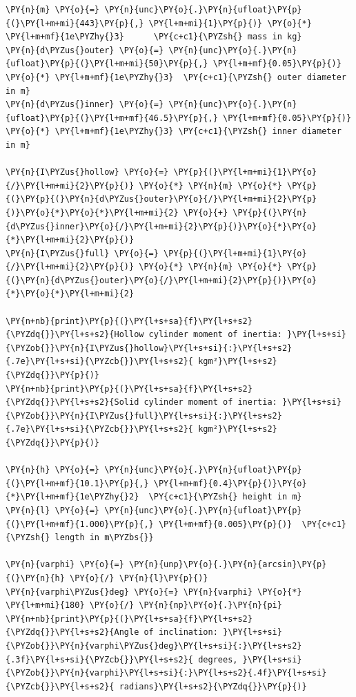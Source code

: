     \begin{tcolorbox}[breakable, size=fbox, boxrule=1pt, pad at break*=1mm,colback=cellbackground, colframe=cellborder]
\begin{Verbatim}[commandchars=\\\{\}]
\PY{n}{m} \PY{o}{=} \PY{n}{unc}\PY{o}{.}\PY{n}{ufloat}\PY{p}{(}\PY{l+m+mi}{443}\PY{p}{,} \PY{l+m+mi}{1}\PY{p}{)} \PY{o}{*} \PY{l+m+mf}{1e\PYZhy{}3}      \PY{c+c1}{\PYZsh{} mass in kg}
\PY{n}{d\PYZus{}outer} \PY{o}{=} \PY{n}{unc}\PY{o}{.}\PY{n}{ufloat}\PY{p}{(}\PY{l+m+mi}{50}\PY{p}{,} \PY{l+m+mf}{0.05}\PY{p}{)} \PY{o}{*} \PY{l+m+mf}{1e\PYZhy{}3}  \PY{c+c1}{\PYZsh{} outer diameter in m}
\PY{n}{d\PYZus{}inner} \PY{o}{=} \PY{n}{unc}\PY{o}{.}\PY{n}{ufloat}\PY{p}{(}\PY{l+m+mf}{46.5}\PY{p}{,} \PY{l+m+mf}{0.05}\PY{p}{)} \PY{o}{*} \PY{l+m+mf}{1e\PYZhy{}3} \PY{c+c1}{\PYZsh{} inner diameter in m}

\PY{n}{I\PYZus{}hollow} \PY{o}{=} \PY{p}{(}\PY{l+m+mi}{1}\PY{o}{/}\PY{l+m+mi}{2}\PY{p}{)} \PY{o}{*} \PY{n}{m} \PY{o}{*} \PY{p}{(}\PY{p}{(}\PY{n}{d\PYZus{}outer}\PY{o}{/}\PY{l+m+mi}{2}\PY{p}{)}\PY{o}{*}\PY{o}{*}\PY{l+m+mi}{2} \PY{o}{+} \PY{p}{(}\PY{n}{d\PYZus{}inner}\PY{o}{/}\PY{l+m+mi}{2}\PY{p}{)}\PY{o}{*}\PY{o}{*}\PY{l+m+mi}{2}\PY{p}{)}
\PY{n}{I\PYZus{}full} \PY{o}{=} \PY{p}{(}\PY{l+m+mi}{1}\PY{o}{/}\PY{l+m+mi}{2}\PY{p}{)} \PY{o}{*} \PY{n}{m} \PY{o}{*} \PY{p}{(}\PY{n}{d\PYZus{}outer}\PY{o}{/}\PY{l+m+mi}{2}\PY{p}{)}\PY{o}{*}\PY{o}{*}\PY{l+m+mi}{2}

\PY{n+nb}{print}\PY{p}{(}\PY{l+s+sa}{f}\PY{l+s+s2}{\PYZdq{}}\PY{l+s+s2}{Hollow cylinder moment of inertia: }\PY{l+s+si}{\PYZob{}}\PY{n}{I\PYZus{}hollow}\PY{l+s+si}{:}\PY{l+s+s2}{.7e}\PY{l+s+si}{\PYZcb{}}\PY{l+s+s2}{ kgm²}\PY{l+s+s2}{\PYZdq{}}\PY{p}{)}
\PY{n+nb}{print}\PY{p}{(}\PY{l+s+sa}{f}\PY{l+s+s2}{\PYZdq{}}\PY{l+s+s2}{Solid cylinder moment of inertia: }\PY{l+s+si}{\PYZob{}}\PY{n}{I\PYZus{}full}\PY{l+s+si}{:}\PY{l+s+s2}{.7e}\PY{l+s+si}{\PYZcb{}}\PY{l+s+s2}{ kgm²}\PY{l+s+s2}{\PYZdq{}}\PY{p}{)}

\PY{n}{h} \PY{o}{=} \PY{n}{unc}\PY{o}{.}\PY{n}{ufloat}\PY{p}{(}\PY{l+m+mf}{10.1}\PY{p}{,} \PY{l+m+mf}{0.4}\PY{p}{)}\PY{o}{*}\PY{l+m+mf}{1e\PYZhy{}2}  \PY{c+c1}{\PYZsh{} height in m}
\PY{n}{l} \PY{o}{=} \PY{n}{unc}\PY{o}{.}\PY{n}{ufloat}\PY{p}{(}\PY{l+m+mf}{1.000}\PY{p}{,} \PY{l+m+mf}{0.005}\PY{p}{)}  \PY{c+c1}{\PYZsh{} length in m\PYZbs{}}
    
\PY{n}{varphi} \PY{o}{=} \PY{n}{unp}\PY{o}{.}\PY{n}{arcsin}\PY{p}{(}\PY{n}{h} \PY{o}{/} \PY{n}{l}\PY{p}{)}
\PY{n}{varphi\PYZus{}deg} \PY{o}{=} \PY{n}{varphi} \PY{o}{*} \PY{l+m+mi}{180} \PY{o}{/} \PY{n}{np}\PY{o}{.}\PY{n}{pi}
\PY{n+nb}{print}\PY{p}{(}\PY{l+s+sa}{f}\PY{l+s+s2}{\PYZdq{}}\PY{l+s+s2}{Angle of inclination: }\PY{l+s+si}{\PYZob{}}\PY{n}{varphi\PYZus{}deg}\PY{l+s+si}{:}\PY{l+s+s2}{.3f}\PY{l+s+si}{\PYZcb{}}\PY{l+s+s2}{ degrees, }\PY{l+s+si}{\PYZob{}}\PY{n}{varphi}\PY{l+s+si}{:}\PY{l+s+s2}{.4f}\PY{l+s+si}{\PYZcb{}}\PY{l+s+s2}{ radians}\PY{l+s+s2}{\PYZdq{}}\PY{p}{)}
\end{Verbatim}
\end{tcolorbox}

